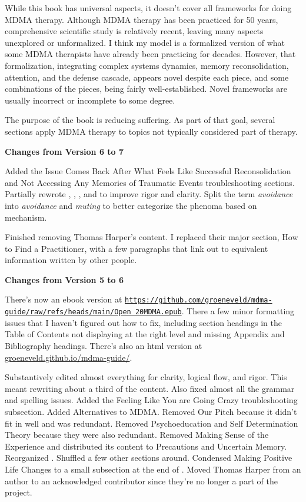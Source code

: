 \documentclass[11pt,oneside]{book}
\newcommand{\frontsection}[1]{%
  \par\vspace{2\baselineskip}%
  {\centering\sffamily\bfseries\large #1\par}%
  \nopagebreak\vspace{\baselineskip}%
}
\begin{document}
While this book has universal aspects, it doesn't cover all frameworks for doing MDMA therapy. Although MDMA therapy has been practiced for 50 years, comprehensive scientific study is relatively recent, leaving many aspects unexplored or unformalized. I think my model is a formalized version of what some MDMA therapists have already been practicing for decades. However, that formalization, integrating complex systems dynamics, memory reconsolidation, attention, and the defense cascade, appears novel despite each piece, and some combinations of the pieces, being fairly well-established. Novel frameworks are usually incorrect or incomplete to some degree.

The purpose of the book is reducing suffering. As part of that goal, several sections apply MDMA therapy to topics not typically considered part of therapy.

\clearpage

\newpage

\frontsection{Changes from Version 6 to 7}
Added the Issue Comes Back After What Feels Like Successful Reconsolidation and Not Accessing Any Memories of Traumatic Events troubleshooting sections. Partially rewrote , , , and  to improve rigor and clarity. Split the term \textit{avoidance} into \textit{avoidance} and \textit{muting} to better categorize the phenoma based on mechanism.

Finished removing Thomas Harper's content. I replaced their major section, How to Find a Practitioner, with a few paragraphs that link out to equivalent information written by other people.

\frontsection{Changes from Version 5 to 6}
There's now an ebook version at \href{https://github.com/groeneveld/mdma-guide/raw/refs/heads/main/Open%20MDMA.epub}{\nolinkurl{https://github.com/groeneveld/mdma-guide/raw/refs/heads/main/Open 20MDMA.epub}}. There a few minor formatting issues that I haven't figured out how to fix, including section headings in the Table of Contents not displaying at the right level and missing Appendix and Bibliography headings. There's also an html version at \href{https://groeneveld.github.io/mdma-guide/}{groeneveld.github.io/mdma-guide/}.

Substantively edited almost everything for clarity, logical flow, and rigor. This meant rewriting about a third of the content. Also fixed almost all the grammar and spelling issues. Added the Feeling Like You are Going Crazy troubleshooting subsection. Added Alternatives to MDMA. Removed Our Pitch because it didn't fit in well and was redundant. Removed Psychoeducation and Self Determination Theory because they were also redundant. Removed Making Sense of the Experience and distributed its content to Precautions and Uncertain Memory. Reorganized . Shuffled a few other sections around. Condensed Making Positive Life Changes to a small subsection at the end of . Moved Thomas Harper from an author to an acknowledged contributor since they're no longer a part of the project.
\end{document}
